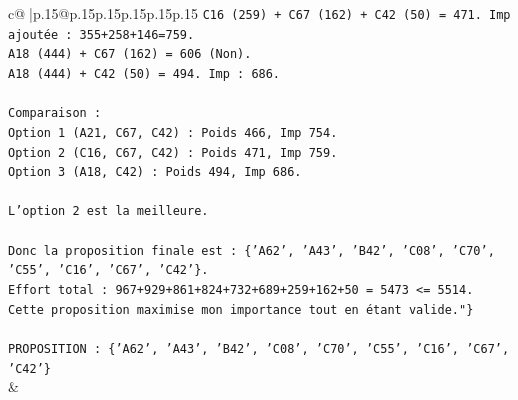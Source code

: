 \documentclass{article}
\begin{document}
{\begin{supertabular}{c@{$\;$}|p{.15\linewidth}@{}p{.15\linewidth}p{.15\linewidth}p{.15\linewidth}p{.15\linewidth}p{.15\linewidth}}
{{{\texttt{C16 (259) + C67 (162) + C42 (50) = 471. Imp ajoutée : 355+258+146=759.} \\
\texttt{A18 (444) + C67 (162) = 606 (Non).} \\
\texttt{A18 (444) + C42 (50) = 494. Imp : 686.} \\
\\ 
\texttt{Comparaison :} \\
\texttt{Option 1 (A21, C67, C42) : Poids 466, Imp 754.} \\
\texttt{Option 2 (C16, C67, C42) : Poids 471, Imp 759.} \\
\texttt{Option 3 (A18, C42) : Poids 494, Imp 686.} \\
\\ 
\texttt{L'option 2 est la meilleure.} \\
\\ 
\texttt{Donc la proposition finale est : \{'A62', 'A43', 'B42', 'C08', 'C70', 'C55', 'C16', 'C67', 'C42'\}.} \\
\texttt{Effort total : 967+929+861+824+732+689+259+162+50 = 5473 <= 5514.} \\
\texttt{Cette proposition maximise mon importance tout en étant valide."\}} \\
\\ 
\texttt{PROPOSITION : \{'A62', 'A43', 'B42', 'C08', 'C70', 'C55', 'C16', 'C67', 'C42'\}} \\
            }
        }
    }
    & \\ \\


\end{supertabular}}
\end{document}
